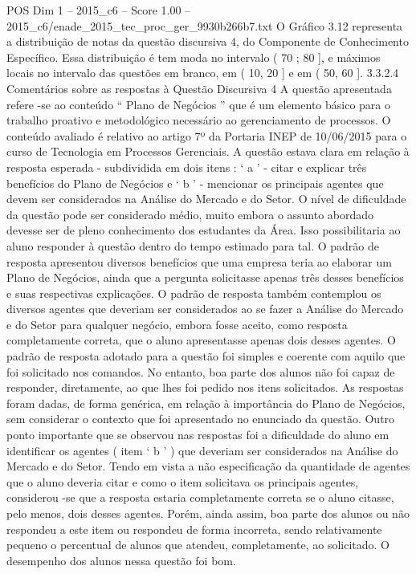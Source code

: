 \begin{textsample}{POS Dim 1 – 2015\_c6 – Score 1.00 – 2015\_c6/enade\_2015\_tec\_proc\_ger\_9930b266b7.txt}
O Gráfico 3.12 representa a distribuição de notas da questão discursiva 4, do Componente de Conhecimento Específico.
Essa distribuição é tem moda no intervalo ( 70 ; 80 ], e máximos locais no intervalo das questões em branco, em ( 10, 20 ] e em ( 50, 60 ]. 3.3.2.4 Comentários sobre as respostas à Questão Discursiva 4 A questão apresentada refere -se ao conteúdo “ Plano de Negócios ” que é um elemento básico para o trabalho proativo e metodológico necessário ao gerenciamento de processos.
O conteúdo avaliado é relativo ao artigo 7º da Portaria INEP de 10/06/2015 para o curso de Tecnologia em Processos Gerenciais.
A questão estava clara em relação à resposta esperada - subdividida em dois itens : ‘ a ’ - citar e explicar três benefícios do Plano de Negócios e ‘ b ’ - mencionar os principais agentes que devem ser considerados na Análise do Mercado e do Setor.
O nível de dificuldade da questão pode ser considerado médio, muito embora o assunto abordado devesse ser de pleno conhecimento dos estudantes da Área.
Isso possibilitaria ao aluno responder à questão dentro do tempo estimado para tal.
O padrão de resposta apresentou diversos benefícios que uma empresa teria ao elaborar um Plano de Negócios, ainda que a pergunta solicitasse apenas três desses benefícios e suas respectivas explicações.
O padrão de resposta também contemplou os diversos agentes que deveriam ser considerados ao se fazer a Análise do Mercado e do Setor para qualquer negócio, embora fosse aceito, como resposta completamente correta, que o aluno apresentasse apenas dois desses agentes.
O padrão de resposta adotado para a questão foi simples e coerente com aquilo que foi solicitado nos comandos.
No entanto, boa parte dos alunos não foi capaz de responder, diretamente, ao que lhes foi pedido nos itens solicitados.
As respostas foram dadas, de forma genérica, em relação à importância do Plano de Negócios, sem considerar o contexto que foi apresentado no enunciado da questão.
Outro ponto importante que se observou nas respostas foi a dificuldade do aluno em identificar os agentes ( item ‘ b ’ ) que deveriam ser considerados na Análise do Mercado e do Setor.
Tendo em vista a não especificação da quantidade de agentes que o aluno deveria citar e como o item solicitava os principais agentes, considerou -se que a resposta estaria completamente correta se o aluno citasse, pelo menos, dois desses agentes.
Porém, ainda assim, boa parte dos alunos ou não respondeu a este item ou respondeu de forma incorreta, sendo relativamente pequeno o percentual de alunos que atendeu, completamente, ao solicitado.
O desempenho dos alunos nessa questão foi bom.

\end{textsample}
